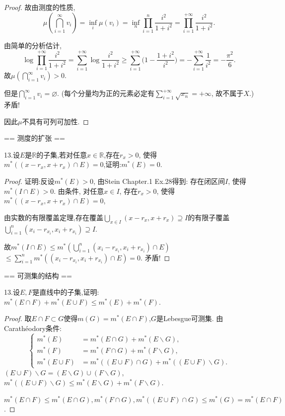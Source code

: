 \begin{proof}
    故由测度的性质,
    \[\mu (\bigcap_{i=1}^{\infty} v_i) = \inf_{i} \mu(v_i) 
    =\inf_{n} \prod_{i=1}^n \frac{i^2}{1+i^2} 
    = \prod_{i=1}^{+\infty}\frac{i^2}{1+i^2}. \]
    
    
    由简单的分析估计,
    \[\log \prod_{i=1}^{+\infty}\frac{i^2}{1+i^2} 
    = \sum_{i=1}^{+\infty}\log \frac{i^2}{1+i^2} 
    \geq \sum_{i=1} ^{+\infty}\Big(1-\frac{1+i^2}{i^2}\Big) 
    = -\sum_{i=1}^{+\infty} \frac{1}{i^2} = -\frac{\pi^2}{6}.\]
    故$\mu(\bigcap \limits_{i=1} ^{\infty} v_i) > 0$.

    但是$\bigcap \limits_{i=1}^{\infty} v_i = \varnothing$.
    (每个分量均为正的元素必定有$\sum \limits_{i=1}^{+\infty} \sqrt{x_n} = +\infty$, 
    故不属于$X$.) 矛盾!

    因此$\mu$不具有可列可加性.
\end{proof}

== 测度的扩张 ==

13.设$E$是$\mathbb{R}$的子集,若对任意$x\in \mathbb{R}$,存在$r_x > 0$, 
使得$m^*((x-r_x,x+r_x) \cap E) = 0$,证明:$m^*(E) = 0$.
\begin{proof}
    证明:反设$m^*(E) > 0$, 由Stein Chapter.1 Ex.28得到:
    存在闭区间$I$, 使得$m^*(I \cap E) > 0$.
    由条件, 对任意$x \in I$, 存在$r_x > 0$, 使得$m^*((x-r_x,x+r_x) \cap E) = 0$,
    
    由实数的有限覆盖定理,存在覆盖$\bigcup \limits_{x\in I} (x-r_x, x+r_x) \supseteq I$的有限子覆盖$\bigcup \limits_{i=1}^n (x_i-r_{x_i}, x_i+r_{x_i}) \supseteq I$.
    
    故$m^*(I\cap E) \leq m^*(\bigcup \limits_{i=1}^n (x_i-r_{x_i}, x_i+r_{x_i}) \cap E) $$\leq \sum \limits_{i=1}^n m^* ((x_i-r_{x_i}, x_i+r_{x_i}) \cap E) = 0.$
    矛盾!
\end{proof}

== 可测集的结构 ==

13.设$E,F$是直线中的子集,证明: $m^*(E\cap F) + m^*(E\cup F) \leq m^*(E) + m^*(F)$.
\begin{proof}
    取$E\cap F \subset G$使得$m(G)=m^*(E\cap F)$,$G$是Lebesgue可测集.
    由Carathéodory条件:
    \begin{equation*}\left\{\begin{aligned}
        m^*(E) &= m^*(E\cap G) + m^*(E\backslash G),\\
        m^*(F) &= m^*(F\cap G) + m^*(F\backslash G),\\
        m^*(E\cup F) &= m^* ((E\cup F) \cap G) + m^*((E\cup F) \backslash G).
    \end{aligned}\right.\end{equation*}
    $(E\cup F) \backslash G= (E \backslash G) \cup (F \backslash G)$,$m^*((E\cup F) \backslash G)\leq m^*(E\backslash G) + m^*(F\backslash G)$.
    
    $m^*(E\cap F)\leq m^*(E\cap G),m^*(F\cap G),m^*((E\cup F)\cap G)\leq m^*(G)=m^*(E\cap F)$.
\end{proof}
